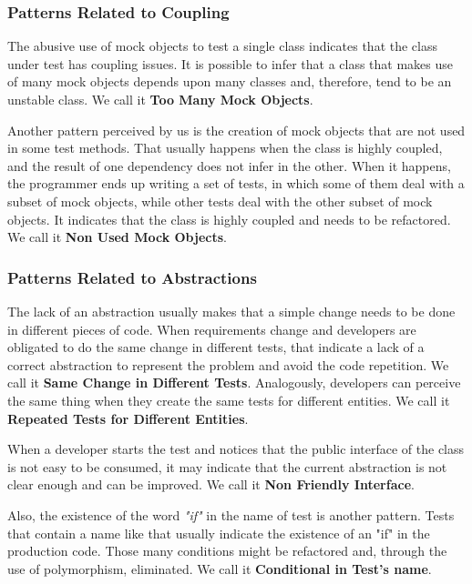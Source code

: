 \documentclass[times]{speauth}
\begin{document}
\subsubsection{Patterns Related to Coupling}

The abusive use of mock objects to test a single class indicates that
the class under test has coupling issues. It is possible to infer that a class
that makes use of many mock objects depends upon many classes and, therefore,
tend to be an unstable class. We call it \textbf{Too Many Mock Objects}.

Another pattern perceived by us is the creation of mock objects that are
not used in some test methods. That usually happens when the class
is highly coupled, and the result of one dependency does not infer in
the other. When it happens, the programmer ends up writing a set of tests,
in which some of them deal with a subset of mock objects, while other
tests deal with the other subset of mock objects. It indicates that
the class is highly coupled and needs to be refactored. We call it
\textbf{Non Used Mock Objects}.

\subsubsection{Patterns Related to Abstractions}

The lack of an abstraction usually makes that a simple change needs to
be done in different pieces of code. When requirements change and
developers are obligated to do the same change in different tests,
that indicate a lack of a correct abstraction to represent the problem
and avoid the code repetition. We call it \textbf{Same Change in Different Tests}.
Analogously, developers can perceive the same thing when they create the
same tests for different entities. We call it \textbf{Repeated Tests for Different Entities}.

When a developer starts the test and notices that the public interface of the class
is not easy to be consumed, it may indicate that the current abstraction is not
clear enough and can be improved. We call it \textbf{Non Friendly Interface}.

Also, the existence of the word \textit{"if"} in the name of test is another
pattern. Tests that contain a name like that usually indicate the existence
of an "if" in the production code. Those many conditions might be refactored and,
through the use of polymorphism, eliminated. We call it \textbf{Conditional in Test's name}.
\end{document}
